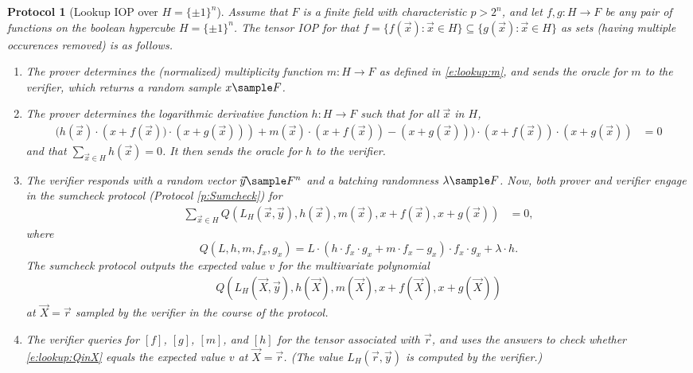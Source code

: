 \documentclass[11pt]{article}
\newtheorem{protocol}[]{Protocol}
\theoremstyle{definition}
\theoremstyle{remark}
\begin{document}
\begin{protocol}[Lookup IOP over $H=\{\pm 1\}^n$]
\label{prot:lookup}
Assume that $F$ is a finite field with characteristic $p > 2^n$, and let $f,g :H\rightarrow F$ be any pair of functions on the boolean hypercube $H=\{\pm 1\}^n$.
The tensor IOP for that $f = \{f(\vec x) : \vec x\in H\}\subseteq \{g(\vec x) : \vec x\in H\}$ as sets (having multiple occurences removed) is as follows.
\begin{enumerate} 
\item
The prover determines the (normalized) multiplicity function $m:H\rightarrow F$ as defined in \eqref{e:lookup:m},
and sends the oracle for $m$ to the verifier, which returns a random sample $x\sample F$.

\item
\label{i:lookup:step1}
The prover determines the logarithmic derivative function $h: H\longrightarrow F$ such that for all $\vec x$ in $H$,
\begin{align*} 
	\Big(h(\vec x)\cdot \left(x + f(\vec x))\cdot (x + g(\vec x)) \right) +  m(\vec x) \cdot (x + f(\vec x)) - (x + g(\vec x)) \Big)\cdot  (x + f(\vec x))\cdot (x + g(\vec x)) &= 0
\end{align*}
and that $\sum_{\vec x\in H} h(\vec x) = 0$.
It then sends the oracle for $h$ to the verifier.

\item
\label{i:lookup:step2}
The verifier responds with a random vector $\vec y \sample F^n$ and a batching randomness $\lambda\sample F$.
Now, both prover and verifier engage in the sumcheck protocol (Protocol \ref{p:Sumcheck}) for 
\begin{align*} 
\sum_{\vec x \in H} Q(L_H(\vec x, \vec y),  h(\vec x), m(\vec x),  x + f(\vec x),  x + g(\vec x))&= 0,
\end{align*}
where 
\begin{equation}
\label{e:lookup:Q}
Q(L,h,m, f_x, g_x) =   
L\cdot  \left(h \cdot f_x \cdot g_x + m\cdot f_x-  g_x\right)\cdot  f_x \cdot g_x +  \lambda \cdot h.
\end{equation}
The sumcheck protocol outputs the expected value $v$ for the multivariate polynomial 
\begin{equation}
\label{e:lookup:QinX}
\begin{aligned}
Q(L_H(\vec X, \vec y), h(\vec X), m(\vec X), x + f(\vec X),  x + g(\vec X))
\end{aligned}
\end{equation}
at $\vec X=\vec r$ sampled by the verifier in the course of the protocol.

\item
The verifier queries for  $[f]$, $[g]$, $[m]$, and $[h]$ for the tensor associated with $\vec r$, and uses the answers 
to check whether \eqref{e:lookup:QinX} equals the expected value $v$ at $\vec X = \vec r$. 
(The value $L_H(\vec r, \vec y)$ is computed by the verifier.)
\end{enumerate}
\end{protocol}
\end{document}
